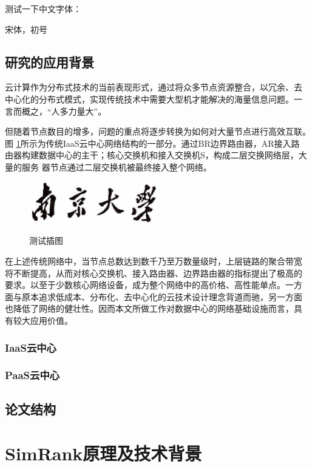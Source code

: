 \documentclass[master]{njuthesis}
\begin{document}
测试一下中文字体：

{\songti{} 宋体，初号}


\section{研究的应用背景}
云计算作为分布式技术的当前表现形式，通过将众多节点资源整合，以冗余、去
中心化的分布式模式，实现传统技术中需要大型机才能解决的海量信息问题。一
言而概之，“人多力量大”。

但随着节点数目的增多，问题的重点将逐步转换为如何对大量节点进行高效互联。图
\ref{fig:test1}所示为传统IaaS云中心网络结构的一部分。通过BR边界路由器，AR接入路
由器构建数据中心的主干；核心交换机和接入交换机S，构成二层交换网络层，大量的服务
器节点通过二层交换机被最终接入整个网络。
\begin{figure}[htbp]
  \centering
  \includegraphics[width= 0.5\textwidth]{njuname.eps}\\
  \caption{测试插图}\label{fig:test1}
\end{figure}
在上述传统网络中，当节点总数达到数千乃至万数量级时，上层链路的聚合带宽
将不断提高，从而对核心交换机、接入路由器、边界路由器的指标提出了极高的
要求。以至于少数核心网络设备，成为整个网络中的高价格、高性能单点。一方
面与原本追求低成本、分布化、去中心化的云技术设计理念背道而驰，另一方面
也降低了网络的健壮性。因而本文所做工作对数据中心的网络基础设施而言，具
有较大应用价值。
\subsection{IaaS云中心}

\subsection{PaaS云中心}

\section{论文结构}


\chapter{SimRank原理及技术背景}\label{chapter_smallworld}
\end{document}
